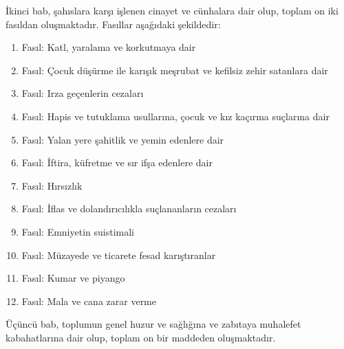 İkinci bab, şahıslara karşı işlenen cinayet ve cünhalara dair olup, toplam on iki fasıldan oluşmaktadır. Fasıllar aşağıdaki şekildedir:
\begin{enumerate}
    \item Fasıl: Katl, yaralama ve korkutmaya dair 
    \item Fasıl: Çocuk düşürme ile karışık meşrubat ve kefilsiz zehir satanlara dair
    \item Fasıl: Irza geçenlerin cezaları
    \item Fasıl: Hapis ve tutuklama usullarına, çocuk ve kız kaçırma suçlarına dair
    \item Fasıl: Yalan yere şahitlik ve yemin edenlere dair
    \item Fasıl: İftira, küfretme ve sır ifşa edenlere dair
    \item Fasıl: Hırsızlık
    \item Fasıl: İflas ve dolandırıcılıkla suçlananların cezaları
    \item Fasıl: Emniyetin suistimali
    \item Fasıl: Müzayede ve ticarete fesad karıştıranlar
    \item Fasıl: Kumar ve piyango
    \item Fasıl: Mala ve cana zarar verme
\end{enumerate}

Üçüncü bab, toplumun genel huzur ve sağlığına ve zabıtaya muhalefet kabahatlarına dair olup, toplam on bir maddeden oluşmaktadır.

